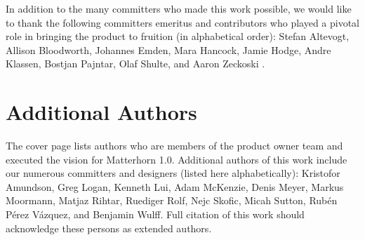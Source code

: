 \documentclass{sig-alternate}
\begin{document}
In addition to the many committers who made this work possible, we would like to thank the following committers emeritus and contributors who played a pivotal role in bringing the product to fruition (in alphabetical order): Stefan Altevogt, Allison Bloodworth, Johannes Emden, Mara Hancock, Jamie Hodge, Andre Klassen, Bostjan Pajntar, Olaf Shulte, and Aaron Zeckoski \cite{clark:pct}.




\section{Additional Authors}
The cover page lists authors who are members of the product owner team and executed the vision for Matterhorn 1.0.  Additional authors of this work include our numerous committers and designers (listed here alphabetically): Kristofor Amundson, Greg Logan, Kenneth Lui, Adam McKenzie, Denis Meyer, Markus Moormann, Matjaz Rihtar, Ruediger Rolf, Nejc Skofic, Micah Sutton, Rub\'{e}n P\'{e}rez V\'{a}zquez, and Benjamin Wulff.  Full citation of this work should acknowledge these persons as extended authors.
\end{document}
